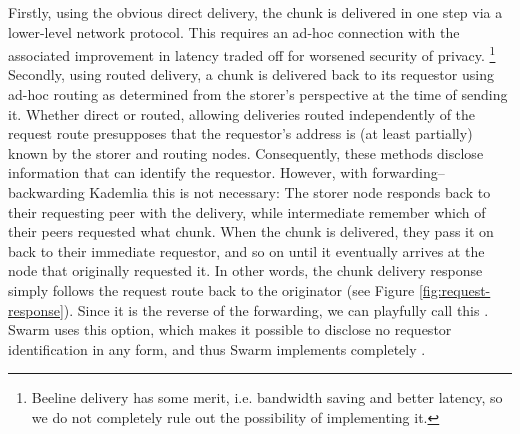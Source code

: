Firstly, using the obvious direct delivery, the chunk is delivered in one step via a lower-level network protocol. This requires an ad-hoc connection with the associated improvement in latency traded off for worsened security of privacy.%
%
\footnote{Beeline delivery has some merit, i.e. bandwidth saving and better latency, so we do not completely rule out the possibility of implementing it. 
}
Secondly, using routed delivery, a chunk is delivered back to its requestor using ad-hoc routing as determined from the storer's perspective at the time of sending it. Whether direct or routed, allowing deliveries routed independently of the request route presupposes that the requestor's address is (at least partially) known by the storer and routing nodes. Consequently, these methods disclose information that can identify the requestor. However, with forwarding--backwarding Kademlia this is not necessary: The storer node responds back to their requesting peer with the delivery, while intermediate  remember which of their peers requested what chunk. When the chunk is delivered, they pass it on back to their immediate requestor, and so on until it eventually arrives at the node that originally requested it. In other words, the chunk delivery response simply follows the request route back to the originator (see Figure \ref{fig:request-response}).  Since it is the reverse of the forwarding, we can playfully call this . Swarm uses this option, which makes it possible to disclose no requestor identification in any form, and thus Swarm implements completely . 

